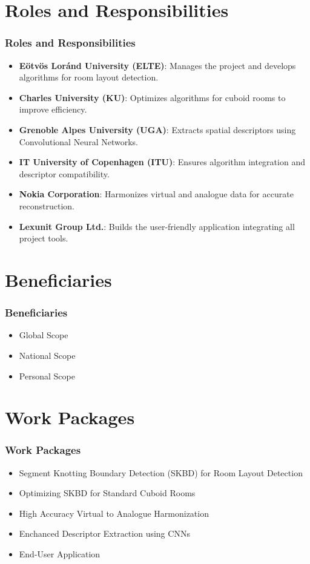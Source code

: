 \documentclass{beamer}
\begin{document}
\section{Roles and Responsibilities}
\begin{frame}
\frametitle{Roles and Responsibilities}
\begin{itemize}
    \item \textbf{Eötvös Loránd University (ELTE)}: Manages the project and develops algorithms for room layout detection.
    \item \textbf{Charles University (KU)}: Optimizes algorithms for cuboid rooms to improve efficiency.
    \item \textbf{Grenoble Alpes University (UGA)}: Extracts spatial descriptors using Convolutional Neural Networks.
    \item \textbf{IT University of Copenhagen (ITU)}: Ensures algorithm integration and descriptor compatibility.
    \item \textbf{Nokia Corporation}: Harmonizes virtual and analogue data for accurate reconstruction.
    \item \textbf{Lexunit Group Ltd.}: Builds the user-friendly application integrating all project tools.
\end{itemize}
\end{frame}

\section{Beneficiaries}
\begin{frame}
\frametitle{Beneficiaries}
\begin{itemize}
    \item Global Scope
    \item National Scope
    \item Personal Scope
\end{itemize}
\end{frame}


\section{Work Packages}
\begin{frame}
\frametitle{Work Packages}
\begin{itemize}
    \item Segment Knotting Boundary Detection (SKBD) for Room Layout Detection
    \item Optimizing SKBD for Standard Cuboid Rooms
    \item High Accuracy Virtual to Analogue Harmonization
    \item Enchanced Descriptor Extraction using CNNs
    \item End-User Application
\end{itemize}
\end{frame}
\end{document}
